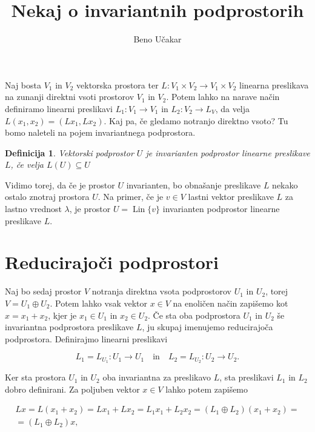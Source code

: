 \documentclass[a4paper,12pt]{article}
\title{Nekaj o invariantnih podprostorih}
\author{Beno Učakar}
\date{}
\newtheorem{definicija}{\textbf{Definicija}}
\DeclareMathOperator{\Lin}{Lin}
\begin{document}
\maketitle

Naj bosta $V_1$ in $V_2$ vektorska prostora ter $L \colon V_1 \times V_2 \to V_1 \times V_2$ linearna preslikava na zunanji direktni vsoti prostorov $V_1$ in $V_2$.
Potem lahko na narave način definiramo linearni preslikavi $L_1 \colon V_1 \to V_1$ in $L_2 \colon V_2 \to L_V$, da velja  
\(L(x_1, x_2) = (Lx_1, Lx_2).\)
Kaj pa, če gledamo notranjo direktno vsoto? Tu bomo naleteli na pojem invariantnega podprostora.

    \begin{definicija}
    Vektorski podprostor $U$ je invarianten podprostor linearne preslikave $L$, če velja 
    $L(U) \subseteq U$
    \end{definicija}

Vidimo torej, da če je prostor $U$ invarianten, bo obnašanje preslikave $L$ nekako ostalo znotraj prostora $U$.
Na primer, če je $v \in V$ lastni vektor preslikave $L$ za lastno vrednost $\lambda$, je prostor 
\(U = \Lin \{ v \}\) invarianten podprostor linearne preslikave $L$.

\section*{Reducirajoči podprostori}

Naj bo sedaj prostor $V$ notranja direktna vsota podprostorov $U_1$ in $U_2$, torej $V = U_1 \oplus U_2$.
Potem lahko vsak vektor $x \in V$ na enoličen način zapišemo kot $x = x_1 + x_2$, kjer je $x_1 \in U_1$ in $x_2 \in U_2$.
Če sta oba podprostora $U_1$ in $U_2$ še invariantna podprostora preslikave $L$, ju skupaj imenujemo reducirajoča podprostora.
Definirajmo linearni preslikavi 


% 
$$
L_1 = L _{U_1} \colon U_1 \to U_1 \quad \text{in} \quad L_2 = L _{U_2} \colon U_2 \to U_2. 
$$

Ker sta prostora $U_1$ in $U_2$ oba invariantna za preslikavo $L$, sta preslikavi $L_1$ in $L_2$ dobro definirani.
Za poljuben vektor $x \in V$ lahko potem zapišemo 


\begin{multline}
    Lx = L(x_1 + x_2) = Lx_1+ Lx_2 = L_1x_1 + L_2x_2 = (L_1 \oplus L_2)(x_1 + x_2)= \\
    = (L_1 \oplus L_2)x,
\end{multline}
\end{document}
